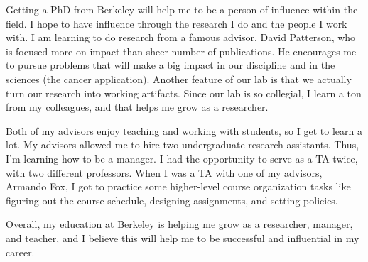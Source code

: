 \documentclass{article}
\begin{document}
Getting a PhD from Berkeley will help me to be a person of influence within the field.
I hope to have influence through the research I do and the people I work with.
I am learning to do research from a famous advisor, David Patterson, who is focused more on impact than sheer number of publications.
He encourages me to pursue problems that will make a big impact in our discipline and in the sciences (the cancer application).
Another feature of our lab is that we actually turn our research into working artifacts.
Since our lab is so collegial, I learn a ton from my colleagues, and that helps me grow as a researcher.

Both of my advisors enjoy teaching and working with students, so I get to learn a lot.
My advisors allowed me to hire two undergraduate research assistants.
Thus, I'm learning how to be a manager.
I had the opportunity to serve as a TA twice, with two different professors.
When I was a TA with one of my advisors, Armando Fox, I got to practice some higher-level course organization tasks like figuring out the course schedule, designing assignments, and setting policies.

Overall, my education at Berkeley is helping me grow as a researcher, manager, and teacher, and I believe this will help me to be successful and influential in my career.
\end{document}
